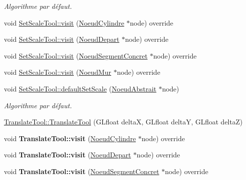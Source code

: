 \begin{DoxyCompactItemize}
\begin{DoxyCompactList}\small\item\em Algorithme par défaut. \end{DoxyCompactList}\item 
void \hyperlink{group__inf2990_gae12ec27e420078166d0f1fbce51ea3c1}{Set\+Scale\+Tool\+::visit} (\hyperlink{class_noeud_cylindre}{Noeud\+Cylindre} $\ast$node) override
\item 
void \hyperlink{group__inf2990_ga372ff3eab42997c84eb768fdf72a5dcc}{Set\+Scale\+Tool\+::visit} (\hyperlink{class_noeud_depart}{Noeud\+Depart} $\ast$node) override
\item 
void \hyperlink{group__inf2990_ga3f0a73ab0f183d9d4e3a6820442f17a2}{Set\+Scale\+Tool\+::visit} (\hyperlink{class_noeud_segment_concret}{Noeud\+Segment\+Concret} $\ast$node) override
\item 
void \hyperlink{group__inf2990_ga51cfb7f08b02858b45b2beb9e51a8dce}{Set\+Scale\+Tool\+::visit} (\hyperlink{class_noeud_mur}{Noeud\+Mur} $\ast$node) override
\item 
void \hyperlink{group__inf2990_ga589b51975cc03cea1752747ef558a45d}{Set\+Scale\+Tool\+::default\+Set\+Scale} (\hyperlink{class_noeud_abstrait}{Noeud\+Abstrait} $\ast$node)
\begin{DoxyCompactList}\small\item\em Algorithme par défaut. \end{DoxyCompactList}\item 
\hyperlink{group__inf2990_ga48e1c155fef64a5a07991df870721ae6}{Translate\+Tool\+::\+Translate\+Tool} (G\+Lfloat delta\+X, G\+Lfloat delta\+Y, G\+Lfloat delta\+Z)
\item 
\hypertarget{group__inf2990_ga64811cbd57db1cb725dc0d472c8f5ab1}{}void {\bfseries Translate\+Tool\+::visit} (\hyperlink{class_noeud_cylindre}{Noeud\+Cylindre} $\ast$node) override\label{group__inf2990_ga64811cbd57db1cb725dc0d472c8f5ab1}

\item 
\hypertarget{group__inf2990_gab0781475ac48f2dcb8610bfee475aba3}{}void {\bfseries Translate\+Tool\+::visit} (\hyperlink{class_noeud_depart}{Noeud\+Depart} $\ast$node) override\label{group__inf2990_gab0781475ac48f2dcb8610bfee475aba3}

\item 
\hypertarget{group__inf2990_ga3533e88b9fcc0f815cccb9e33773d756}{}void {\bfseries Translate\+Tool\+::visit} (\hyperlink{class_noeud_segment_concret}{Noeud\+Segment\+Concret} $\ast$node) override\label{group__inf2990_ga3533e88b9fcc0f815cccb9e33773d756}


\end{DoxyCompactItemize}
